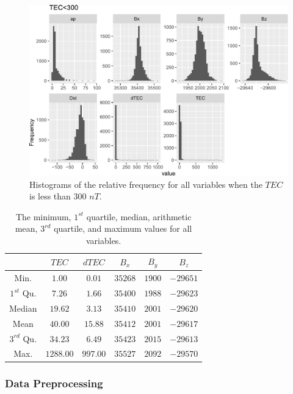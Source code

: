 \documentclass[sn-mathphys-num]{sn-jnl}%
\begin{document}
\begin{figure}
 \centering
 \includegraphics[width=0.9\linewidth]{300TEC_fix.pdf}
    \caption{Histograms of the relative frequency for all variables when the $TEC$ is less than $300$ $nT$.}
    \label{fig:300TEC}
\end{figure}

\begin{table}[!ht]
    \centering
    \caption{The minimum, $1^{st}$ quartile, median, arithmetic mean, $3^{rd}$ quartile, and maximum values for all variables.}
    \label{tab:minmax}
    \begin{tabular}{|c|c|c|c|c|c|}
        \hline
        & $TEC$ & $dTEC$ & $B_{x}$ & $B_{y}$ & $B_{z}$ \\ \hline
        Min. & $1.00$ & $0.01$ & $35268$ & $1900$ & $-29651$ \\ \hline
        $1^{st}$ Qu. & $7.26$ & $1.66$ & $35400$ & $1988$ & $-29623$ \\ \hline
        Median & $19.62$ & $3.13$ & $35410$ & $2001$ & $-29620$ \\ \hline
        Mean & $40.00$ & $15.88$ & $35412$ & $2001$ & $-29617$ \\ \hline
        $3^{rd}$ Qu. & $34.23$ & $6.49$ & $35423$ & $2015$ & $-29613$ \\ \hline
        Max. & $1288.00$ & $997.00$ & $35527$ & $2092$ & $-29570$ \\ \hline
    \end{tabular}
\end{table}

\subsubsection{Data Preprocessing}
\end{document}
